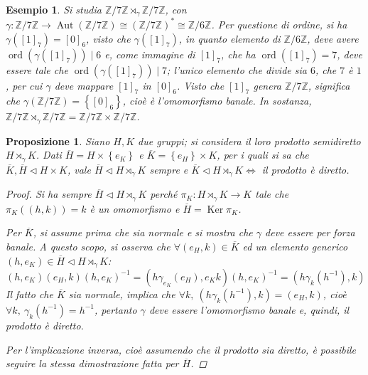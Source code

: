 \documentclass[12pt]{scrartcl}
\theoremstyle{style}
\newtheorem{esempio}{Esempio}[section]
\newtheorem{prop}{Proposizione}[section]
\numberwithin{equation}{subsection}
\begin{document}
\begin{esempio}
Si studia $\mathbb{Z}/ 7\mathbb{Z} \rtimes _\gamma \mathbb{Z}/7\mathbb{Z}$, con $\gamma : \mathbb{Z} / 7\mathbb{Z}\to \operatorname{Aut} (\mathbb{Z}/7\mathbb{Z})\cong(\mathbb{Z}/7\mathbb{Z})^*\cong \mathbb{Z}/6\mathbb{Z}$.
Per questione di ordine, si ha $\gamma([1]_7) = [0]_6$, visto che $\gamma([1]_7)$, in quanto elemento di $\mathbb{Z}/6\mathbb{Z}$, deve avere $\operatorname{ord}(\gamma([1]_7))  \mid 6$ e, come immagine di $[1]_7$, che ha $\operatorname{ord}([1]_7) = 7$, deve essere tale che $\operatorname{ord}(\gamma([1]_7))  \mid 7$; l'unico elemento che divide sia $6$, che $7$ \`e $1$, per cui $\gamma$ deve mappare $[1]_7 $ in $[0]_6$.
Visto che $[1]_7$ genera $\mathbb{Z}/7\mathbb{Z}$, significa che $\gamma(\mathbb{Z}/7\mathbb{Z})=\left\{ [0]_6 \right\} $, cio\`e \`e l'omomorfismo banale.
In sostanza, $\mathbb{Z}/7\mathbb{Z}\rtimes _\gamma \mathbb{Z}/ 7\mathbb{Z} = \mathbb{Z}/7\mathbb{Z} \times \mathbb{Z}/7\mathbb{Z}$.
\end{esempio}
\begin{prop}
	Siano $H,K$ due gruppi; si considera il loro prodotto semidiretto $H\rtimes _\gamma K$. 
Dati $\overline{H}= H \times \left\{ e_K \right\} $ e $\overline{K}= \left\{ e_H \right\} \times K$, per i quali si sa che $\overline{K},\overline{H}\lhd H \times K$, vale $\overline{H}\lhd H \rtimes _\gamma K$ sempre e $\overline{K}\lhd H \rtimes _\gamma K \iff $ il prodotto \`e diretto.
\begin{proof}
	Si ha sempre $\overline{H}\lhd H\rtimes _\gamma K$ perch\'e $\pi_K : H \rtimes _\gamma K \to K$ tale che $\pi_K((h,k)) = k$ \`e un omomorfismo e $\overline{H} = \operatorname{Ker} \pi_K$.
	
	Per $\overline{K}$, si assume prima che sia normale e si mostra che $\gamma$ deve essere per forza banale.
	A questo scopo, si osserva che $\forall (e_H, k) \in \overline{K}$ ed un elemento generico $(h,e_K) \in \overline{H}\lhd H \rtimes _\gamma K$:
	\[
		(h,e_K)(e_H,k)(h,e_K)^{-1}=(h \gamma_{e_K} (e_H), e_K k)(h,e_K)^{-1} = (h \gamma_k(h^{-1}),k)
	\] 
	Il fatto che $\overline{K}$ sia normale, implica che $\forall k, \ (h\gamma_k(h^{-1}),k)=(e_H,k)$, cio\`e $\forall k, \ \gamma_k(h^{-1}) = h^{-1}$, pertanto $\gamma$ deve essere l'omomorfismo banale e, quindi, il prodotto \`e diretto.

	Per l'implicazione inversa, cio\`e assumendo che il prodotto sia diretto, \`e possibile seguire la stessa dimostrazione fatta per $\overline{H}$.
\end{proof}
\end{prop}
\end{document}
